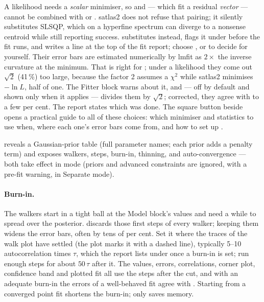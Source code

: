 A likelihood needs a \emph{scalar} minimiser, so  and
 --- which fit a residual \emph{vector} --- cannot
be combined with  or . satlas2 does
not refuse that pairing; it silently substitutes SLSQP, which on a
hyperfine spectrum can diverge to a nonsense centroid while still
reporting success. \denis{} substitutes  instead, flags it
under  before the fit runs, and writes a
\code{[Minimiser]} line at the top of the fit report; choose
,  or  to decide for yourself.
Their error bars are estimated numerically by lmfit as $2\times$
the inverse curvature at the minimum. That is right for
; under a likelihood they come out $\sqrt{2}$ (41\,\%)
too large, because the factor 2 assumes a $\chi^2$ while satlas2
minimises $-\ln L$, half of one. The Fitter block warns about it, and
 --- off by default and shown only
when it applies --- divides them by $\sqrt{2}$; corrected, they agree
with  to a few per cent. The report states which was
done. The square
 button beside  opens a practical guide to all of
these choices: which minimiser and statistics to use when, where each
one's error bars come from, and how to set up .

 reveals a Gaussian-prior table (full parameter
names; each prior adds a penalty term) and 
exposes walkers, steps, burn-in, thinning, and auto-convergence ---
both take effect in  mode (priors and advanced
constraints are ignored, with a pre-fit warning, in Separate mode).

\paragraph{Burn-in.}
The walkers start in a tight ball at the Model block's values and
need a while to spread over the posterior.  discards
those first steps of every walker; keeping them widens the error
bars, often by tens of per cent. Set it where the traces of the walk plot have
settled (the plot marks it with a dashed line), typically 5--10
autocorrelation times $\tau$, which the report lists under
\code{[[Burn-in]]} once a burn-in is set; run enough steps for about
$50\,\tau$ after it. The values, errors, correlations, corner plot,
confidence band and plotted fit all use the steps after the cut, and
with an adequate burn-in the  errors of a well-behaved
fit agree with . Starting  from a converged
point fit shortens the burn-in;  only saves memory.

